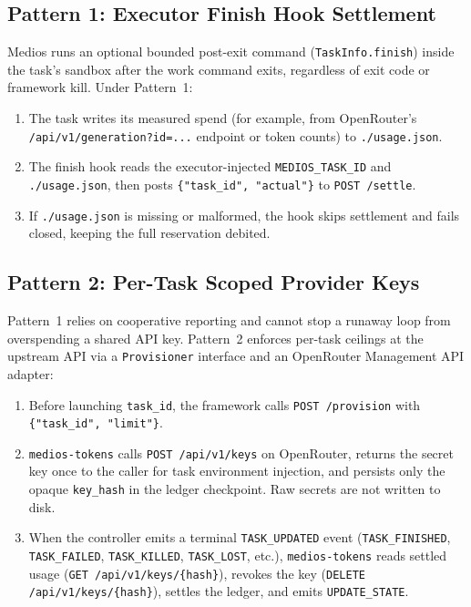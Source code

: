 \documentclass[11pt]{article}
\begin{document}
\subsection{Pattern 1: Executor Finish Hook Settlement}
Medios runs an optional bounded post-exit command (\texttt{TaskInfo.finish}) inside the task's sandbox after the work command exits, regardless of exit code or framework kill. Under Pattern~1:
\begin{enumerate}
  \item The task writes its measured spend (for example, from OpenRouter's \texttt{/api/v1/generation?id=...} endpoint or token counts) to \texttt{./usage.json}.
  \item The finish hook reads the executor-injected \texttt{MEDIOS\_TASK\_ID} and \texttt{./usage.json}, then posts \texttt{\{"task\_id", "actual"\}} to \texttt{POST /settle}.
  \item If \texttt{./usage.json} is missing or malformed, the hook skips settlement and fails closed, keeping the full reservation debited.
\end{enumerate}

\subsection{Pattern 2: Per-Task Scoped Provider Keys}
Pattern~1 relies on cooperative reporting and cannot stop a runaway loop from overspending a shared API key. Pattern~2 enforces per-task ceilings at the upstream API via a \texttt{Provisioner} interface and an OpenRouter Management API adapter:
\begin{enumerate}
  \item Before launching \texttt{task\_id}, the framework calls \texttt{POST /provision} with \texttt{\{"task\_id", "limit"\}}.
  \item \texttt{medios-tokens} calls \texttt{POST /api/v1/keys} on OpenRouter, returns the secret key once to the caller for task environment injection, and persists only the opaque \texttt{key\_hash} in the ledger checkpoint. Raw secrets are not written to disk.
  \item When the controller emits a terminal \texttt{TASK\_UPDATED} event (\texttt{TASK\_FINISHED}, \texttt{TASK\_FAILED}, \texttt{TASK\_KILLED}, \texttt{TASK\_LOST}, etc.), \texttt{medios-tokens} reads settled usage (\texttt{GET /api/v1/keys/\{hash\}}), revokes the key (\texttt{DELETE /api/v1/keys/\{hash\}}), settles the ledger, and emits \texttt{UPDATE\_STATE}.
\end{enumerate}
\end{document}
